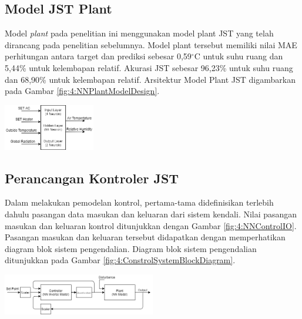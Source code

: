 \documentclass[a4paper,10pt]{article}
\makeatletter
\newenvironment{body}{\begin{multicols}{2}}{\end{multicols}}
\renewenvironment{figure}
{\def\@captype{figure}%
	\captionsetup{labelsep=period,format=hang,font=footnotesize,justification=justified}
}
{}
\makeatother
\begin{document}
\begin{body}
		\subsection{Model JST Plant}\label{subsec:4:err}
		
		Model \textit{plant} pada penelitian ini menggunakan model plant JST yang telah dirancang pada penelitian sebelumnya\cite{skripsiTanto}. Model plant tersebut memiliki nilai MAE perhitungan antara target dan prediksi sebesar 0,59$^{\circ}$C untuk suhu ruang dan 5,44\% untuk kelembapan relatif. Akurasi JST sebesar 96,23\% untuk suhu ruang dan 68,90\% untuk kelembapan relatif. Arsitektur Model Plant JST digambarkan pada Gambar \ref{fig:4:NNPlantModelDesign}.\\
		
		\begin{figure}
			\centering
			\includegraphics[width=0.3\textwidth]{figures/NNPlantModelDesign}
			\caption{Arsitektur Model Plant JST}
			\label{fig:4:NNPlantModelDesign}
		\end{figure}
		
		\subsection{Perancangan Kontroler JST}
		
		Dalam melakukan pemodelan kontrol, pertama-tama didefinisikan terlebih dahulu pasangan data masukan dan keluaran dari sistem kendali. Nilai pasangan masukan dan keluaran kontrol ditunjukkan dengan Gambar \ref{fig:4:NNControlIO}. Pasangan masukan dan keluaran tersebut didapatkan dengan memperhatikan diagram blok sistem pengendalian. Diagram blok sistem pengendalian ditunjukkan pada Gambar \ref{fig:4:ConstrolSystemBlockDiagram}.\\
		
		\begin{figure}
			\centering
			\includegraphics[width=0.5\textwidth]{figures/ControlDesignDiagramII}
			\caption{Diagram blok sistem kontrol berbasis JST\cite{paper42Paisan}}
			\label{fig:4:ConstrolSystemBlockDiagram}
		\end{figure}
	\vspace{1em}
		

\end{body}
\end{document}
